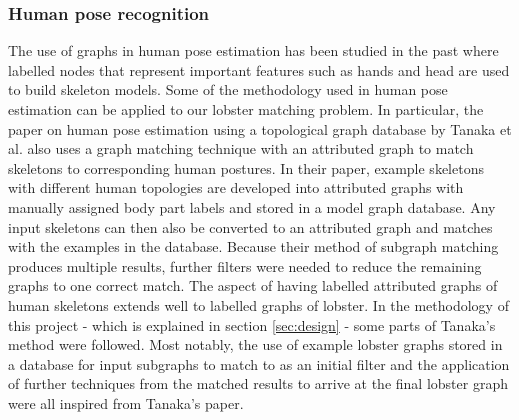\subsubsection{Human pose recognition}
The use of graphs in human pose estimation has been studied in the past
\cite{human-pose} \cite{human-skeleton} where labelled nodes that represent important features such as hands and head are used to build skeleton models.
\n
Some of the methodology used in human pose estimation can be applied to our lobster matching problem. In particular, the paper on human pose estimation using a topological graph database \cite{human-pose} by Tanaka et al. also uses a graph matching technique with an attributed graph to match skeletons to corresponding human postures. In their paper, example skeletons with different human topologies are developed into attributed graphs with manually assigned body part labels and stored in a model graph database. Any input skeletons can then also be converted to an attributed graph and matches with the examples in the database. Because their method of subgraph matching produces multiple results, further filters were needed to reduce the remaining graphs to one correct match. 
\noindent
The aspect of having labelled attributed graphs of human skeletons extends well to labelled graphs of lobster. In the methodology of this project - which is explained in section \ref{sec:design} - some parts of Tanaka's method were followed. Most notably, the use of example lobster graphs stored in a database for input subgraphs to match to as an initial filter and the application of further techniques from the matched results to arrive at the final lobster graph were all inspired from Tanaka's paper.
 

